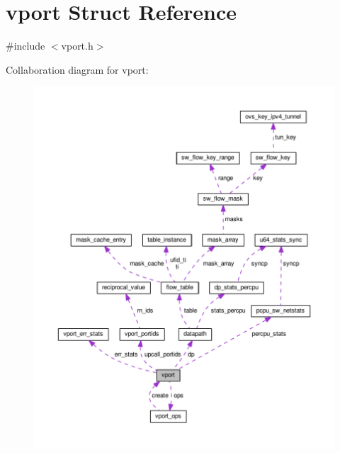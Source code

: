 \hypertarget{structvport}{}\section{vport Struct Reference}
\label{structvport}


{\ttfamily \#include $<$vport.\+h$>$}



Collaboration diagram for vport\+:
\nopagebreak
\begin{figure}[H]
\begin{center}
\leavevmode
\includegraphics[width=350pt]{structvport__coll__graph}
\end{center}
\end{figure}
